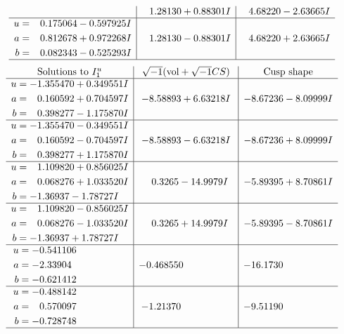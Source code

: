 \documentclass[1p]{elsarticle_modified}
\theoremstyle{definition}
\newcommand{\I}{\sqrt{-1}}
\begin{document}
$$\begin{array}{c|c|c}
 & \phantom{-}1.28130 + 0.88301 I & \phantom{-}4.68220 - 2.63665 I \\ \hline\begin{aligned}
u &= \phantom{-}0.175064 - 0.597925 I \\
a &= \phantom{-}0.812678 + 0.972268 I \\
b &= \phantom{-}0.082343 - 0.525293 I\end{aligned}
 & \phantom{-}1.28130 - 0.88301 I & \phantom{-}4.68220 + 2.63665 I\\
 \hline 
 \end{array}$$\newpage$$\begin{array}{c|c|c}  
\text{Solutions to }I^u_{1}& \I (\text{vol} + \sqrt{-1}CS) & \text{Cusp shape}\\
 \hline 
\begin{aligned}
u &= -1.355470 + 0.349551 I \\
a &= \phantom{-}0.160592 + 0.704597 I \\
b &= \phantom{-}0.398277 - 1.175870 I\end{aligned}
 & -8.58893 + 6.63218 I & -8.67236 - 8.09999 I \\ \hline\begin{aligned}
u &= -1.355470 - 0.349551 I \\
a &= \phantom{-}0.160592 - 0.704597 I \\
b &= \phantom{-}0.398277 + 1.175870 I\end{aligned}
 & -8.58893 - 6.63218 I & -8.67236 + 8.09999 I \\ \hline\begin{aligned}
u &= \phantom{-}1.109820 + 0.856025 I \\
a &= \phantom{-}0.068276 + 1.033520 I \\
b &= -1.36937 - 1.78727 I\end{aligned}
 & \phantom{-}0.3265 - 14.9979 I & -5.89395 + 8.70861 I \\ \hline\begin{aligned}
u &= \phantom{-}1.109820 - 0.856025 I \\
a &= \phantom{-}0.068276 - 1.033520 I \\
b &= -1.36937 + 1.78727 I\end{aligned}
 & \phantom{-}0.3265 + 14.9979 I & -5.89395 - 8.70861 I \\ \hline\begin{aligned}
u &= -0.541106\phantom{ +0.000000I} \\
a &= -2.33904\phantom{ +0.000000I} \\
b &= -0.621412\phantom{ +0.000000I}\end{aligned}
 & -0.468550\phantom{ +0.000000I} & -16.1730\phantom{ +0.000000I} \\ \hline\begin{aligned}
u &= -0.488142\phantom{ +0.000000I} \\
a &= \phantom{-}0.570097\phantom{ +0.000000I} \\
b &= -0.728748\phantom{ +0.000000I}\end{aligned}
 & -1.21370\phantom{ +0.000000I} & -9.51190\phantom{ +0.000000I}\\
 \hline 
 \end{array}$$\newpage\newpage\renewcommand{\arraystretch}{1}
\end{document}
